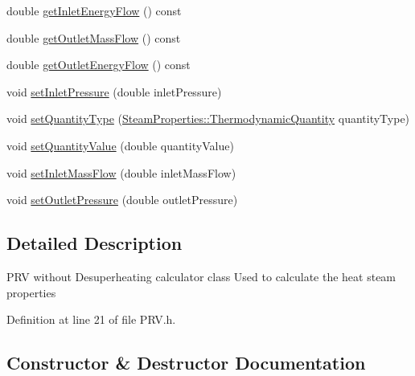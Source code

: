 \begin{DoxyCompactItemize}
\item 
double \hyperlink{class_prv_without_desuperheating_a040dbe6a11a722f15450cd00ac454c48}{get\+Inlet\+Energy\+Flow} () const
\item 
double \hyperlink{class_prv_without_desuperheating_a12c0bf1f0c29e56e6e07ece3fe865c1b}{get\+Outlet\+Mass\+Flow} () const
\item 
double \hyperlink{class_prv_without_desuperheating_ab13245e86b90832de0b4190163236551}{get\+Outlet\+Energy\+Flow} () const
\item 
void \hyperlink{class_prv_without_desuperheating_a26039a0a228ca66f96e8402bf741b9d9}{set\+Inlet\+Pressure} (double inlet\+Pressure)
\item 
void \hyperlink{class_prv_without_desuperheating_a212177b7a16c7452358df4120196c04b}{set\+Quantity\+Type} (\hyperlink{class_steam_properties_ae0294bedf7d178c2d8fb6aed0f62fbff}{Steam\+Properties\+::\+Thermodynamic\+Quantity} quantity\+Type)
\item 
void \hyperlink{class_prv_without_desuperheating_a5ed2d0f0f558705d482ed0502131757f}{set\+Quantity\+Value} (double quantity\+Value)
\item 
void \hyperlink{class_prv_without_desuperheating_abeccff2dc91144452b34ca343ee63fa7}{set\+Inlet\+Mass\+Flow} (double inlet\+Mass\+Flow)
\item 
void \hyperlink{class_prv_without_desuperheating_a0f2a4597b58390e5c4a7c75b38bbebbc}{set\+Outlet\+Pressure} (double outlet\+Pressure)
\end{DoxyCompactItemize}


\subsection{Detailed Description}
P\+RV without Desuperheating calculator class Used to calculate the heat steam properties 

Definition at line 21 of file P\+R\+V.\+h.



\subsection{Constructor \& Destructor Documentation}
\mbox{\label{class_prv_without_desuperheating_a27a40131cc8567ec51bb8d6d522268c0}} 
